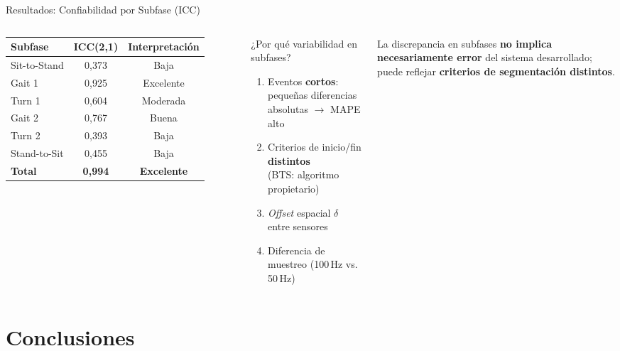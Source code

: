 \documentclass[10pt,aspectratio=169]{beamer}
\begin{document}
\begin{frame}{Resultados: Confiabilidad por Subfase (ICC)}
  \begin{columns}[t]
      \centering
      \small
      \begin{tabular}{lcc}
        \toprule
        \textbf{Subfase} & \textbf{ICC(2,1)}
          & \textbf{Interpretación}\\
        \midrule
        Sit-to-Stand  & 0{,}373 & Baja\\
        Gait 1        & 0{,}925 & \textcolor{green!55!black}{Excelente}\\
        Turn 1        & 0{,}604 & Moderada\\
        Gait 2        & 0{,}767 & Buena\\
        Turn 2        & 0{,}393 & Baja\\
        Stand-to-Sit  & 0{,}455 & Baja\\
        \midrule
        \textbf{Total}& \textbf{0{,}994}
          & \textcolor{green!55!black}{\textbf{Excelente}}\\
        \bottomrule
      \end{tabular}
      \begin{alertblock}{¿Por qué variabilidad en subfases?}
        \begin{enumerate}
          \small
          \item Eventos \textbf{cortos}: pequeñas diferencias
                absolutas $\to$ MAPE alto
          \item Criterios de inicio/fin \textbf{distintos}\\
                (BTS: algoritmo propietario)
          \item \textit{Offset} espacial $\delta$ entre sensores
          \item Diferencia de muestreo (100\,Hz vs.\,50\,Hz)
        \end{enumerate}
      \end{alertblock}
      \vspace{0.4em}
      {\small La discrepancia en subfases \textbf{no implica necesariamente
      error} del sistema desarrollado; puede reflejar
      \textbf{criterios de segmentación distintos}.}
  \end{columns}
\end{frame}

\section{Conclusiones}
\end{document}
